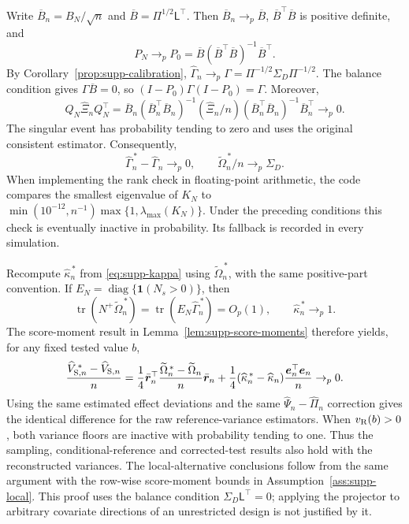 \documentclass[12pt,a4paper]{article}
\theoremstyle{definition}
\theoremstyle{remark}\newtheorem{remark}{Remark}
\numberwithin{equation}{section}
\newcommand{\diag}{\operatorname{diag}}
\begin{document}
Write $\overline B_n=B_N/\sqrt n$ and $\overline B=\Pi^{1/2}\mathsf L^\top$. Then $\overline B_n\to_p\overline B$, $\overline B^\top\overline B$ is positive definite, and
\[
 P_N\to_p P_0=\overline B(\overline B^\top\overline B)^{-1}\overline B^\top.
\]
By Corollary~\ref{prop:supp-calibration},
$\widehat\Gamma_n\to_p\Gamma=\Pi^{-1/2}\Sigma_D\Pi^{-1/2}$.
The balance condition gives $\Gamma\overline B=0$, so
$(I-P_0)\Gamma(I-P_0)=\Gamma$. Moreover,
\[
 Q_N\widehat\Xi_nQ_N^\top
 =\overline B_n(\overline B_n^\top\overline B_n)^{-1}(\widehat\Xi_n/n)
       (\overline B_n^\top\overline B_n)^{-1}\overline B_n^\top\to_p0.
\]
The singular event has probability tending to zero and uses the original consistent estimator. Consequently,
\[
 \widehat\Gamma_n^{\,*}-\widehat\Gamma_n\to_p0,
 \qquad \widetilde\Omega_n^{\,*}/n\to_p\Sigma_D.
\]
When implementing the rank check in floating-point arithmetic, the code compares the smallest eigenvalue of $K_N$ to
$\min(10^{-12},n^{-1})\max\{1,\lambda_{\max}(K_N)\}$.
Under the preceding conditions this check is eventually inactive in probability. Its fallback is recorded in every simulation.

Recompute $\widehat\kappa_n^{\,*}$ from \eqref{eq:supp-kappa} using $\widetilde\Omega_n^{\,*}$, with the same positive-part convention. If $E_N=\diag\{\mathbf1(N_s>0)\}$, then
\[
 \operatorname{tr}(N^+\widetilde\Omega_n^{\,*})
 =\operatorname{tr}(E_N\widehat\Gamma_n^{\,*})=O_p(1),
 \qquad \widehat\kappa_n^{\,*}\to_p1.
\]
The score-moment result in Lemma~\ref{lem:supp-score-moments} therefore yields, for any fixed tested value $b$,
\[
 \frac{\widehat V_{{\rm S},n}^{\,*}-\widehat V_{{\rm S},n}}n
 =\frac14\bar{\bm r}_n^\top
       \frac{\widetilde\Omega_n^{\,*}-\widetilde\Omega_n}{n}\bar{\bm r}_n
   +\frac14(\widehat\kappa_n^{\,*}-\widehat\kappa_n)
       \frac{\bm e_n^\top\bm e_n}{n}\to_p0.
\]
Using the same estimated effect deviations and the same $\widehat\Psi_n-\widehat\Pi_n$ correction gives the identical difference for the raw reference-variance estimators. When $v_{\rm R}(b)>0$, both variance floors are inactive with probability tending to one. Thus the sampling, conditional-reference and corrected-test results also hold with the reconstructed variances. The local-alternative conclusions follow from the same argument with the row-wise score-moment bounds in Assumption~\ref{ass:supp-local}. This proof uses the balance condition $\Sigma_D\mathsf L^\top=0$; applying the projector to arbitrary covariate directions of an unrestricted design is not justified by it.
\end{document}

